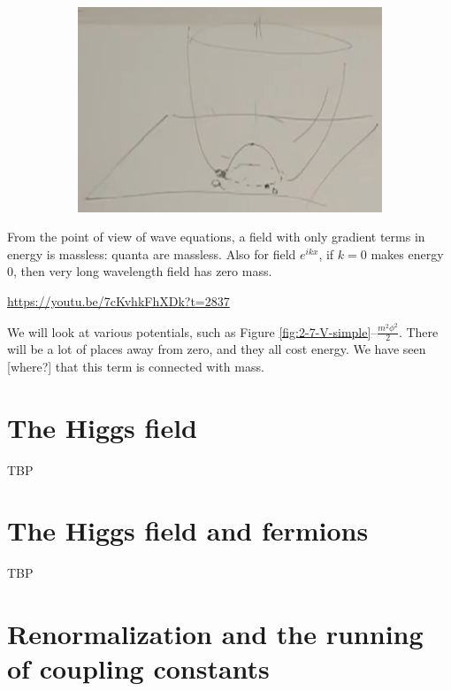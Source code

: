 \documentclass[]{article}
\begin{document}
\begin{figure}[H]
\begin{subfigure}{0.9\textwidth}
\begin{center}
			\includegraphics[width=\textwidth]{2-7-V-quartic-domain-wall}
		\end{center}
	\end{subfigure}
\end{figure}



From the point of view of wave equations, a field with only gradient terms in energy is massless: quanta are massless. Also for field $e^{ikx}$, if $k=0$ makes energy $0$, then very long wavelength field has zero mass.


\url{https://youtu.be/7cKvhkFhXDk?t=2837}

We will look at various potentials, such as Figure \ref{fig:2-7-V-simple}--$\frac{m^2 \phi^2}{2}$. There will be a lot of places away from zero, and they all cost energy. We have seen [where?] that this term is connected with mass.
 
\section{The Higgs field}



TBP

\section{The Higgs field and fermions}

TBP

\section{Renormalization and the running of coupling constants}
\end{document}
